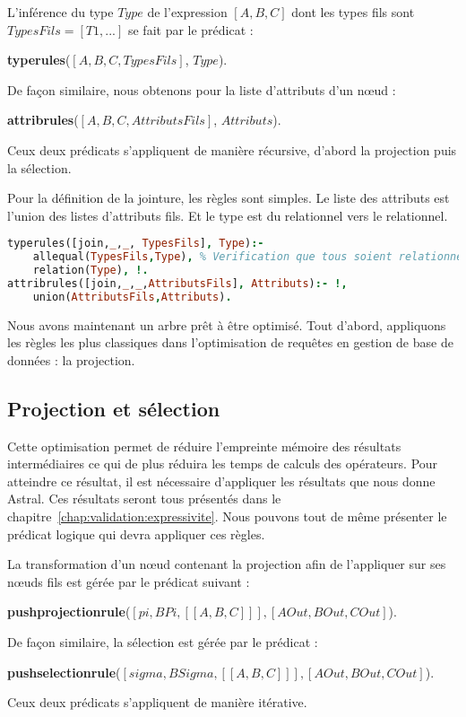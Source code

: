\begin{regle}
L'inférence du type $Type$ de l'expression $[A,B,C]$ dont les types fils sont $TypesFils=[T1,...]$ se fait par le prédicat :
\begin{center} \textbf{typerules}($[A,B,C,TypesFils]$, $Type$).\end{center}
De façon similaire, nous obtenons pour la liste d'attributs d'un nœud :
\begin{center} \textbf{attribrules}($[A,B,C,AttributsFils]$, $Attributs$).\end{center}
Ceux deux prédicats s'appliquent de manière récursive, d'abord la projection puis la sélection.
\end{regle}


\begin{example}
	Pour la définition de la jointure, les règles sont simples. Le liste des attributs est l'union des listes d'attributs fils. Et le type est du relationnel vers le relationnel.
	\begin{lstlisting}[language=Prolog]
typerules([join,_,_, TypesFils], Type):- 
	allequal(TypesFils,Type), % Verification que tous soient relationnels 
	relation(Type), !.
attribrules([join,_,_,AttributsFils], Attributs):- !, 
	union(AttributsFils,Attributs).
	\end{lstlisting}
\end{example}

Nous avons maintenant un arbre prêt à être optimisé. Tout d'abord, appliquons les règles les plus classiques dans l'optimisation de requêtes en gestion de base de données : la projection.

\subsection{Projection et sélection}
Cette optimisation permet de réduire l'empreinte mémoire des résultats intermédiaires ce qui de plus réduira les temps de calculs des opérateurs. Pour atteindre ce résultat, il est nécessaire d'appliquer les résultats que nous donne Astral. Ces résultats seront tous présentés dans le chapitre~\ref{chap:validation:expressivite}. Nous pouvons tout de même présenter le prédicat logique qui devra appliquer ces règles.
\begin{regle}
La transformation d'un nœud contenant la projection afin de l'appliquer sur ses nœuds fils est gérée par le prédicat suivant :
\begin{center} \textbf{pushprojectionrule}($[pi,BPi,[[A,B,C]]],[AOut,BOut,COut]$).\end{center}
De façon similaire, la sélection est gérée par le prédicat :
\begin{center} \textbf{pushselectionrule}($[sigma,BSigma,[[A,B,C]]],[AOut,BOut,COut]$).\end{center}
Ceux deux prédicats s'appliquent de manière itérative.
\end{regle}


